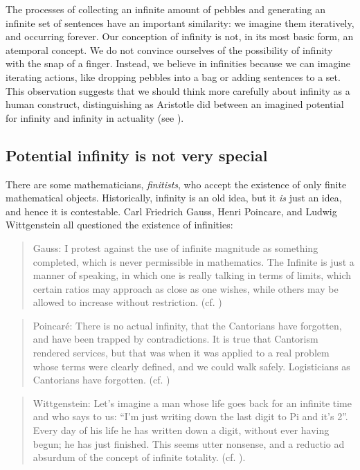   The processes of collecting an infinite amount of pebbles and generating an infinite set of sentences have an important similarity: we imagine them iteratively, and occurring forever. Our conception of infinity is not, in its most basic form, an atemporal concept. We do not convince ourselves of the possibility of infinity with the snap of a finger. Instead, we believe in infinities because we can imagine iterating actions, like dropping pebbles into a bag or adding sentences to a set. This observation suggests that we should think more carefully about infinity as a human construct, distinguishing as Aristotle did between an imagined potential for infinity and infinity in actuality (see \citealt{Lear1988}).

\subsection{Potential infinity is not very special}

There are some mathematicians, \textit{finitists}, who accept the existence of only finite mathematical objects. Historically, infinity is an old idea, but it \textit{is} just an idea, and hence it is contestable. Carl Friedrich Gauss, Henri Poincare, and Ludwig Wittgenstein all questioned the existence of infinities: 

\begin{quote}
Gauss: I protest against the use of infinite magnitude as something completed, which is never permissible in mathematics. The Infinite is just a manner of speaking, in which one is really talking in terms of limits, which certain ratios may approach as close as one wishes, while others may be allowed to increase without restriction. (cf. \citealt{Waterhouse1979})
\end{quote}

\begin{quote}
Poincaré: There is no actual infinity, that the Cantorians have forgotten, and have been trapped by contradictions. It is true that Cantorism rendered services, but that was when it was applied to a real problem whose terms were clearly defined, and we could walk safely. Logisticians as Cantorians have forgotten. (cf. \citealt{PoincaréMaitland2003}) 
\end{quote}

\begin{quote}
Wittgenstein: Let's imagine a man whose life goes back for an infinite time and who says to us: “I'm just writing down the last digit to Pi and it's 2”. Every day of his life he has written down a digit, without ever having begun; he has just finished. This seems utter nonsense, and a reductio ad absurdum of the concept of infinite totality. (cf. \citealt{Wittgenstein1980}).
\end{quote}

